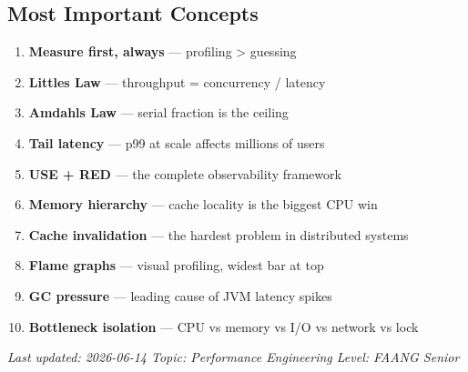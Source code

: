 \documentclass[11pt]{article}
\providecommand{\tightlist}{\setlength{\itemsep}{1pt}\setlength{\parskip}{0pt}}
\begin{document}
\subsection{Most Important Concepts}\label{most-important-concepts}

\begin{enumerate}
\def\labelenumi{\arabic{enumi}.}
\tightlist
\item
  \textbf{Measure first, always} --- profiling \textgreater{} guessing
\item
  \textbf{Little\textquotesingle s Law} --- throughput = concurrency / latency
\item
  \textbf{Amdahl\textquotesingle s Law} --- serial fraction is the ceiling
\item
  \textbf{Tail latency} --- p99 at scale affects millions of users
\item
  \textbf{USE + RED} --- the complete observability framework
\item
  \textbf{Memory hierarchy} --- cache locality is the biggest CPU win
\item
  \textbf{Cache invalidation} --- the hardest problem in distributed systems
\item
  \textbf{Flame graphs} --- visual profiling, widest bar at top
\item
  \textbf{GC pressure} --- leading cause of JVM latency spikes
\item
  \textbf{Bottleneck isolation} --- CPU vs memory vs I/O vs network vs lock
\end{enumerate}

\emph{Last updated: 2026-06-14 \textbar{} Topic: Performance Engineering \textbar{} Level: FAANG Senior}
\end{document}
